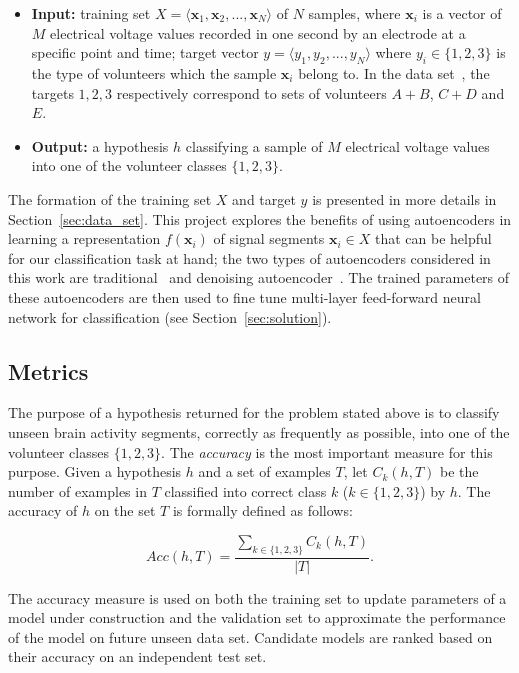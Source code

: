 \documentclass[12pt]{article}
\newcommand{\myvec}[1]{\mathbf{#1}}
\begin{document}
\begin{itemize}
\item \textbf{Input:} training set $X = \langle \myvec{x}_1, \myvec{x}_2, ..., \myvec{x}_N\rangle$ of $N$ samples, where $\myvec{x}_i$ is a vector of $M$ electrical voltage values recorded in one second by an electrode at a specific point and time; target vector $y = \langle y_1, y_2, ..., y_N \rangle$ where $y_i \in \{1, 2, 3\}$ is the type of volunteers which the sample $\myvec{x}_i$ belong to. In the data set~\cite{andrzejak2001indications}, the targets $1, 2, 3$ respectively correspond to sets of volunteers $A + B$, $C + D$ and $E$.
\item \textbf{Output:} a hypothesis $h$ classifying a sample of $M$ electrical voltage values into one of the volunteer classes $\{1, 2, 3\}$.
\end{itemize}

The formation of the training set $X$ and target $y$ is presented in more details in Section~\ref{sec:data_set}. This project explores the benefits of using autoencoders in learning a representation $f(\myvec{x}_i)$ of signal segments $\myvec{x}_i \in X$ that can be helpful for our classification task at hand; the two types of autoencoders considered in this work are traditional~\cite{bengio2007greedy} and denoising autoencoder~\cite{vincent2010stacked}. The trained parameters of these autoencoders are then used to fine tune multi-layer feed-forward neural network for classification (see Section~\ref{sec:solution}). %

\subsection{Metrics}
\label{sec:metric}
The purpose of a hypothesis returned for the problem stated above is to classify unseen brain activity segments, correctly as frequently as possible, into one of the volunteer classes $\{1, 2, 3\}$. The \textit{accuracy} is the most important measure for this purpose. Given a hypothesis $h$ and a set of examples $T$, let $C_k(h,T)$ be the number of examples in $T$ classified into correct class $k$ ($k \in \{1,2,3\}$) by $h$. The accuracy of $h$ on the set $T$ is formally defined as follows:

\[Acc(h, T) = \frac{\sum_{k\in\{1,2,3\}}C_k(h,T)}{|T|}.\]

The accuracy measure is used on both the training set to update parameters of a model under construction and the validation set to approximate the performance of the model on future unseen data set. Candidate models are ranked based on their accuracy on an independent test set.
\end{document}

